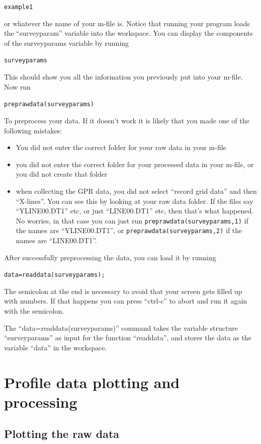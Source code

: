\documentclass[11pt]{article}
\begin{document}
\qquad \verb#example1#

or whatever the name of your m-file is. Notice that running your program
loads the ``surveyparam'' variable into the workspace. You can display the
components of the surveyparams variable by running

\qquad \verb#surveyparams#

This should show you all the information you previously put into your
m-file.  Now run

\qquad \verb#preprawdata(surveyparams)#

To preprocess your data. If it doesn't work it is likely that you made
one of the following mistakes:
\begin{itemize}
\item You did not enter the correct folder for your raw data in your
  m-file
\item you did not enter the correct folder for your processed data in
  your m-file, or you did not create that folder
\item when collecting the GPR data, you did not select ``record grid
  data'' and then ``X-lines''. You can see this by looking at your raw
  data folder. If the files say ``YLINE00.DT1'' etc, or just
  ``LINE00.DT1'' etc, then that's what happened. No worries, in that
  case you can just run \qquad \verb#preprawdata(surveyparams,1)# if
  the names are ``YLINE00.DT1'', or \verb#preprawdata(surveyparams,2)#
  if the names are ``LINE00.DT1''.
\end{itemize}

After successfully preprocessing the data, you can load it by running

\qquad \verb#data=readdata(surveyparams);#

The semicolon at the end is necessary to avoid that your screen gets
filled up with numbers. If that happens you can press ``ctrl-c'' to
abort and run it again with the semicolon.
 
The ``data=readdata(surveyparams)'' command takes the variable structure
``surveyparams'' as input for the function ``readdata'', and stores the 
data as the variable ``data'' in the workspace.

\section{Profile data plotting and processing}\label{secProfiles}

\subsection{Plotting the raw data}
\end{document}
